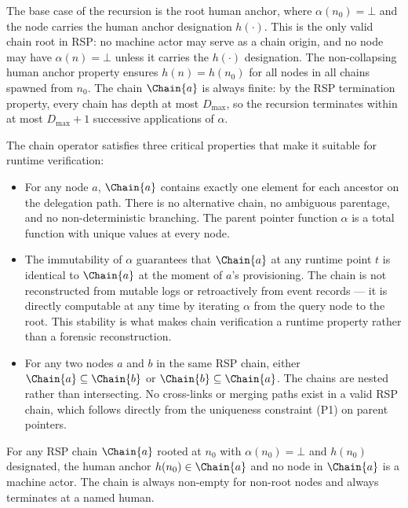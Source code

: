 The base case of the recursion is the root human anchor, where $\alpha(n_0) = \bot$ and the node carries the human anchor designation $h(\cdot)$. This is the only valid chain root in RSP: no machine actor may serve as a chain origin, and no node may have $\alpha(n) = \bot$ unless it carries the $h(\cdot)$ designation. The non-collapsing human anchor property ensures $h(n) = h(n_0)$ for all nodes in all chains spawned from $n_0$. The chain $\Chain{a}$ is always finite: by the RSP termination property, every chain has depth at most $D_{\max}$, so the recursion terminates within at most $D_{\max} + 1$ successive applications of $\alpha$.

The chain operator satisfies three critical properties that make it suitable for runtime verification:

\begin{itemize}
    \item[(C1) \textbf{Determinism}] For any node $a$, $\Chain{a}$ contains exactly one element for each ancestor on the delegation path. There is no alternative chain, no ambiguous parentage, and no non-deterministic branching. The parent pointer function $\alpha$ is a total function with unique values at every node.

    \item[(C2) \textbf{Stability}] The immutability of $\alpha$ guarantees that $\Chain{a}$ at any runtime point $t$ is identical to $\Chain{a}$ at the moment of $a$'s provisioning. The chain is not reconstructed from mutable logs or retroactively from event records --- it is directly computable at any time by iterating $\alpha$ from the query node to the root. This stability is what makes chain verification a runtime property rather than a forensic reconstruction.

    \item[(C3) \textbf{Compositionality}] For any two nodes $a$ and $b$ in the same RSP chain, either $\Chain{a} \subseteq \Chain{b}$ or $\Chain{b} \subseteq \Chain{a}$. The chains are nested rather than intersecting. No cross-links or merging paths exist in a valid RSP chain, which follows directly from the uniqueness constraint (P1) on parent pointers.
\end{itemize}

\begin{corol}
\label{corol:chain-terminates-human}
For any RSP chain $\Chain{a}$ rooted at $n_0$ with $\alpha(n_0) = \bot$ and $h(n_0)$ designated, the human anchor $h(n_0) \in \Chain{a}$ and no node in $\Chain{a}$ is a machine actor. The chain is always non-empty for non-root nodes and always terminates at a named human.
\end{corol}

